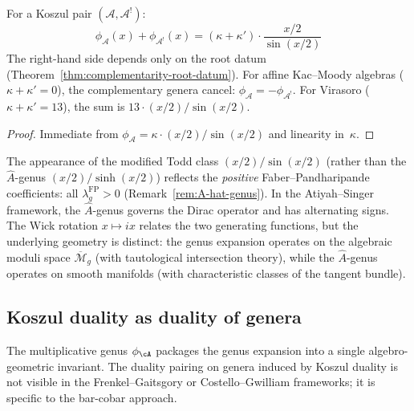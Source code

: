 \begin{corollary}
\label{cor:complementary-genera}
For a Koszul pair $(\mathcal{A}, \mathcal{A}^!)$:
\begin{equation}\label{eq:genus-complementarity}
\phi_{\mathcal{A}}(x) + \phi_{\mathcal{A}^!}(x) = (\kappa + \kappa') \cdot \frac{x/2}{\sin(x/2)}
\end{equation}
The right-hand side depends only on the root datum \textup{(}Theorem~\textup{\ref{thm:complementarity-root-datum})}.  For affine Kac--Moody algebras \textup{(}$\kappa + \kappa' = 0$\textup{)}, the complementary genera cancel: $\phi_{\mathcal{A}} = -\phi_{\mathcal{A}^!}$.  For Virasoro \textup{(}$\kappa + \kappa' = 13$\textup{)}, the sum is $13 \cdot (x/2)/\sin(x/2)$.
\end{corollary}

\begin{proof}
Immediate from $\phi_{\mathcal{A}} = \kappa \cdot (x/2)/\sin(x/2)$ and linearity in~$\kappa$.
\end{proof}

\begin{remark}\label{rem:genus-index-theory}
The appearance of the modified Todd class $(x/2)/\sin(x/2)$ (rather than the $\hat{A}$-genus $(x/2)/\sinh(x/2)$) reflects the \emph{positive} Faber--Pandharipande coefficients: all $\lambda_g^{\mathrm{FP}} > 0$ (Remark~\ref{rem:A-hat-genus}).  In the Atiyah--Singer framework, the $\hat{A}$-genus governs the Dirac operator and has alternating signs.  The Wick rotation $x \mapsto ix$ relates the two generating functions, but the underlying geometry is distinct: the genus expansion operates on the algebraic moduli space $\overline{\mathcal{M}}_g$ (with tautological intersection theory), while the $\hat{A}$-genus operates on smooth manifolds (with characteristic classes of the tangent bundle).
\end{remark}

\subsection{Koszul duality as duality of genera}\label{subsec:koszul-genera-duality}

The multiplicative genus $\phi_{\cA}$ packages the genus expansion into a single
algebro-geometric invariant.  The duality pairing on genera induced by Koszul duality is not visible in the Frenkel--Gaitsgory or Costello--Gwilliam frameworks; it is specific to the bar-cobar approach.


